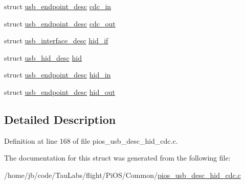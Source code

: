 \begin{DoxyCompactItemize}
\item 
struct \hyperlink{structusb__endpoint__desc}{usb\-\_\-endpoint\-\_\-desc} \hyperlink{group___p_i_o_s___u_s_b___d_e_s_c_ga599b79ff75341552732decb7763cc6c8}{cdc\-\_\-in}
\item 
struct \hyperlink{structusb__endpoint__desc}{usb\-\_\-endpoint\-\_\-desc} \hyperlink{group___p_i_o_s___u_s_b___d_e_s_c_ga38856efc6dd6e0466e9bfb7533992dc3}{cdc\-\_\-out}
\item 
struct \hyperlink{structusb__interface__desc}{usb\-\_\-interface\-\_\-desc} \hyperlink{group___p_i_o_s___u_s_b___d_e_s_c_gadeb93743c31b647e20653e4423233982}{hid\-\_\-if}
\item 
struct \hyperlink{structusb__hid__desc}{usb\-\_\-hid\-\_\-desc} \hyperlink{group___p_i_o_s___u_s_b___d_e_s_c_ga8b4c52ed5995d3193869596bc47a4e58}{hid}
\item 
struct \hyperlink{structusb__endpoint__desc}{usb\-\_\-endpoint\-\_\-desc} \hyperlink{group___p_i_o_s___u_s_b___d_e_s_c_gaf6d4567d3dfbf3397c5842bdef4e13c8}{hid\-\_\-in}
\item 
struct \hyperlink{structusb__endpoint__desc}{usb\-\_\-endpoint\-\_\-desc} \hyperlink{group___p_i_o_s___u_s_b___d_e_s_c_gad76c86a5c7e42e823404bf0e7ddff4f2}{hid\-\_\-out}
\end{DoxyCompactItemize}


\subsection{\-Detailed \-Description}


\-Definition at line 168 of file pios\-\_\-usb\-\_\-desc\-\_\-hid\-\_\-cdc.\-c.



\-The documentation for this struct was generated from the following file\-:\begin{DoxyCompactItemize}
\item 
/home/jb/code/\-Tau\-Labs/flight/\-Pi\-O\-S/\-Common/\hyperlink{pios__usb__desc__hid__cdc_8c}{pios\-\_\-usb\-\_\-desc\-\_\-hid\-\_\-cdc.\-c}\end{DoxyCompactItemize}
